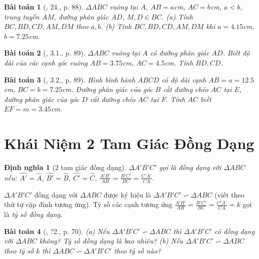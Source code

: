 \documentclass{article}
\newtheorem{baitoan}{Bài toán}
\newtheorem{dinhnghia}{Định nghĩa}
\begin{document}
\begin{baitoan}[\cite{SBT_Toan_8_tap_2}, 24., p. 88]
	$\Delta ABC$ vuông tại $A$, $AB = a$\emph{cm}, $AC = b$\emph{cm}, $a < b$, trung tuyến $AM$, đường phân giác $AD$, $M,D\in BC$. (a) Tính $BC,BD,CD,AM,DM$ theo $a,b$. (b) Tính $BC,BD,CD,AM,DM$ khi $a = 4.15$\emph{cm}, $b = 7.25$\emph{cm}.
\end{baitoan}

\begin{baitoan}[\cite{SBT_Toan_8_tap_2}, 3.1., p. 89]
	$\Delta ABC$ vuông tại $A$ có đường phân giác $AD$. Biết độ dài của các cạnh góc vuông $AB = 3.75$\emph{cm}, $AC = 4.5$\emph{cm}. Tính $BD,CD$.
\end{baitoan}

\begin{baitoan}[\cite{SBT_Toan_8_tap_2}, 3.2., p. 89]
	Hình bình hành $ABCD$ có độ dài cạnh $AB = a = 12.5$\emph{cm}, $BC = b = 7.25$\emph{cm}. Đường phân giác của góc $B$ cắt đường chéo $AC$ tại $E$, đường phân giác của góc $D$ cắt đường chéo $AC$ tại $F$. Tính $AC$ biết $EF = m = 3.45$\emph{cm}.
\end{baitoan}


\section{Khái Niệm 2 Tam Giác Đồng Dạng}

\begin{dinhnghia}[2 tam giác đồng dạng]
	$\Delta A'B'C'$ gọi là \emph{đồng dạng} với $\Delta ABC$ nếu: $\widehat{A'} = \widehat{A}$, $\widehat{B'} = \widehat{B}$, $\widehat{C'} = \widehat{C}$, $\frac{A'B'}{AB} = \frac{B'C'}{BC} = \frac{C'A'}{CA}$.
\end{dinhnghia}
$\Delta A'B'C'$ đồng dạng với $\Delta ABC$ được ký hiệu là $\Delta A'B'C'\backsim\Delta ABC$ (viết theo thứ tự cặp đỉnh tương ứng). Tỷ số các cạnh tương ứng $\frac{A'B'}{AB} = \frac{B'C'}{BC} = \frac{C'A'}{CA} = k$ gọi là \textit{tỷ số đồng dạng}.

\begin{baitoan}[\cite{SGK_Toan_8_tap_2}, ?2., p. 70]
	(a) Nếu $\Delta A'B'C'\backsim\Delta ABC$ thì $\Delta A'B'C'$ có đồng dạng với $\Delta ABC$ không? Tỷ số đồng dạng là bao nhiêu? (b) Nếu $\Delta A'B'C'\backsim\Delta ABC$ theo tỷ số $k$ thì $\Delta ABC\backsim\Delta A'B'C'$ theo tỷ số nào?
\end{baitoan}
\end{document}

